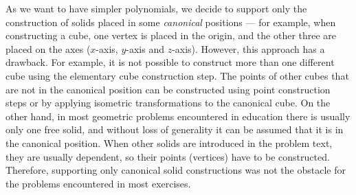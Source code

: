 \documentclass[final,1p,times,authoryear]{elsarticle}
\begin{document}
As we want to have simpler polynomials, we decide to support only the
construction of solids placed in some {\em canonical} positions ---
for example, when constructing a cube, one vertex is placed in the
origin, and the other three are placed on the axes ($x$-axis, $y$-axis
and $z$-axis). However, this approach has a drawback. For example, it
is not possible to construct more than one different cube using the
elementary cube construction step. The points of other cubes that are
not in the canonical position can be constructed using point
construction steps or by applying isometric transformations to the
canonical cube. On the other hand, in most geometric problems
encountered in education there is usually only one free solid, and
without loss of generality it can be assumed that it is in the
canonical position. When other solids are introduced in the problem
text, they are usually dependent, so their points (vertices) have to
be constructed. Therefore, supporting only canonical solid
constructions was not the obstacle for the problems encountered in
most exercises.
\end{document}
